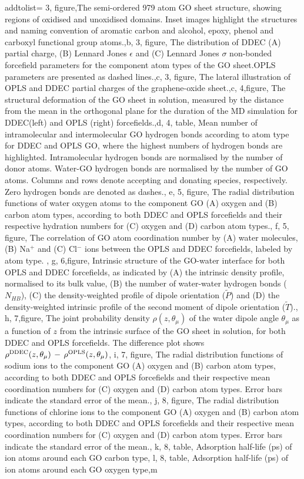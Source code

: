      addtolist={
     3, figure,{The semi-ordered 979 atom GO sheet structure, showing regions of oxidised and unoxidised domains. Inset images highlight the structures and naming convention of aromatic carbon and alcohol, epoxy, phenol and carboxyl functional group atoms.},b,
     3, figure, {The distribution of DDEC (A) partial charge, (B) Lennard Jones $\epsilon$ and (C) Lennard Jones $\sigma$ non-bonded forcefield parameters for the component atom types of the GO sheet.OPLS parameters are presented as dashed lines.},c,
     3, figure, {The lateral illustration of OPLS and DDEC partial charges of the graphene-oxide sheet.},c,
     4,figure, {The structural deformation of the GO sheet in solution, measured by the distance from the mean in the orthogonal plane for the duration of the MD simulation for DDEC(left) and OPLS (right) forcefields.},d,
     4, table, {Mean number of intramolecular and intermolecular GO hydrogen bonds according to atom type for DDEC and OPLS GO, where the highest numbers of hydrogen bonds are highlighted. Intramolecular hydrogen bonds are normalised by the number of donor atoms. Water-GO hydrogen bonds are normalised by the number of GO atoms. Columns and rows denote accepting and donating species, respectively. Zero hydrogen bonds are denoted as dashes.}, e,
     5, figure, {The radial distribution functions of water oxygen atoms to the component GO (A) oxygen and (B) carbon atom types, according to both DDEC and OPLS forcefields and their respective hydration numbers for (C) oxygen and (D) carbon atom types.}, f,
     5, figure, {The correlation of GO atom coordination number by (A) water molecules, (B) Na$^{+}$ and (C) Cl$^{-}$ ions between the OPLS and DDEC forcefields, labeled by atom type. }, g,
     6,figure, {Intrinsic structure of the GO-water interface for both OPLS and DDEC forcefields, as indicated by (A) the intrinsic density profile, normalised to its bulk value, (B) the number of water-water hydrogen bonds ($N_{HB}$), (C) the density-weighted profile of dipole orientation ($\tilde{P}$) and (D) the density-weighted intrinsic profile of the second moment of dipole orientation ($\tilde{T}$).}, h,
     7,figure, {The joint probability density $\rho(z, \theta_{\mu})$ of the water dipole angle $\theta_{\mu}$ as a function of $z$ from the intrinsic surface of the GO sheet in solution, for both DDEC and OPLS forcefields. The difference plot shows $\rho^{\rm{DDEC}}(z, \theta_{\mu})\,-\, \rho^{\rm{OPLS}}(z, \theta_{\mu})$}, i,
     7, figure, {The radial distribution functions of sodium ions to the component GO (A) oxygen and (B) carbon atom types, according to both DDEC and OPLS forcefields and their respective mean coordination numbers for (C) oxygen and (D) carbon atom types. Error bars indicate the standard error of the mean.}, j,
     8, figure, {The radial distribution functions of chlorine ions to the component GO (A) oxygen and (B) carbon atom types, according to both DDEC and OPLS forcefields and their respective mean coordination numbers for (C) oxygen and (D) carbon atom types. Error bars indicate the standard error of the mean.}, k,
     8, table, {Adsorption half-life (ps) of ion atoms around each GO carbon type}, l,
     8, table, {Adsorption half-life (ps) of ion atoms around each GO oxygen type},m}
